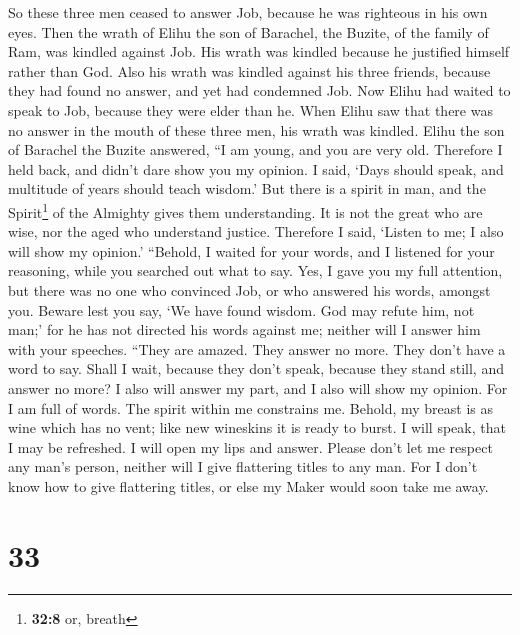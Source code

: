 So these three men ceased to answer Job, because he was
righteous in his own eyes.  Then the wrath of Elihu the
son of Barachel, the Buzite, of the family of Ram, was kindled against
Job. His wrath was kindled because he justified himself rather than God.
 Also his wrath was kindled against his three friends,
because they had found no answer, and yet had condemned Job.
 Now Elihu had waited to speak to Job, because they were
elder than he.  When Elihu saw that there was no answer in
the mouth of these three men, his wrath was kindled. 
Elihu the son of Barachel the Buzite answered, ``I am young, and you are
very old. Therefore I held back, and didn't dare show you my opinion.
 I said, `Days should speak, and multitude of years should
teach wisdom.'  But there is a spirit in man, and the
Spirit\footnote{\textbf{32:8} or, breath} of the Almighty gives them
understanding.  It is not the great who are wise, nor the
aged who understand justice.  Therefore I said, `Listen
to me; I also will show my opinion.'  ``Behold, I waited
for your words, and I listened for your reasoning, while you searched
out what to say.  Yes, I gave you my full attention, but
there was no one who convinced Job, or who answered his words, amongst
you.  Beware lest you say, `We have found wisdom. God may
refute him, not man;'  for he has not directed his words
against me; neither will I answer him with your speeches.
 ``They are amazed. They answer no more. They don't have
a word to say.  Shall I wait, because they don't speak,
because they stand still, and answer no more?  I also
will answer my part, and I also will show my opinion. 
For I am full of words. The spirit within me constrains me.
 Behold, my breast is as wine which has no vent; like new
wineskins it is ready to burst.  I will speak, that I may
be refreshed. I will open my lips and answer.  Please
don't let me respect any man's person, neither will I give flattering
titles to any man.  For I don't know how to give
flattering titles, or else my Maker would soon take me away.

\hypertarget{section-23}{%
\section{33}\label{section-23}}

